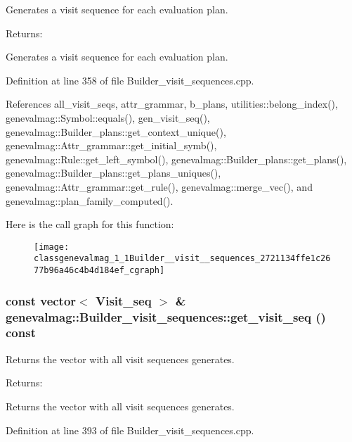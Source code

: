 Generates a visit sequence for each evaluation plan. \begin{Desc}
\item[Returns:]\end{Desc}
Generates a visit sequence for each evaluation plan. 

Definition at line 358 of file Builder\_\-visit\_\-sequences.cpp.

References all\_\-visit\_\-seqs, attr\_\-grammar, b\_\-plans, utilities::belong\_\-index(), genevalmag::Symbol::equals(), gen\_\-visit\_\-seq(), genevalmag::Builder\_\-plans::get\_\-context\_\-unique(), genevalmag::Attr\_\-grammar::get\_\-initial\_\-symb(), genevalmag::Rule::get\_\-left\_\-symbol(), genevalmag::Builder\_\-plans::get\_\-plans(), genevalmag::Builder\_\-plans::get\_\-plans\_\-uniques(), genevalmag::Attr\_\-grammar::get\_\-rule(), genevalmag::merge\_\-vec(), and genevalmag::plan\_\-family\_\-computed().

Here is the call graph for this function:\nopagebreak
\begin{figure}[H]
\begin{center}
\leavevmode
\texttt{[image: classgenevalmag\_1\_1Builder\_\_visit\_\_sequences\_2721134ffe1c2677b96a46c4b4d184ef\_cgraph]}
\end{center}
\end{figure}
\hypertarget{classgenevalmag_1_1Builder__visit__sequences_cf3c542e09500da73d78ddc757f136ec}{
\subsubsection[{get\_\-visit\_\-seq}]{\setlength{\rightskip}{0pt plus 5cm}const vector$<$ {\bf Visit\_\-seq} $>$ \& genevalmag::Builder\_\-visit\_\-sequences::get\_\-visit\_\-seq () const}}
\label{classgenevalmag_1_1Builder__visit__sequences_cf3c542e09500da73d78ddc757f136ec}


Returns the vector with all visit sequences generates. \begin{Desc}
\item[Returns:]\end{Desc}
Returns the vector with all visit sequences generates. 

Definition at line 393 of file Builder\_\-visit\_\-sequences.cpp.

